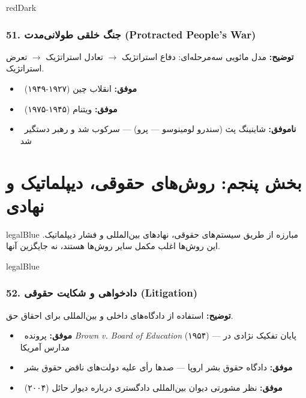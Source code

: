 \documentclass[a4paper,12pt]{article}
\newcommand{\success}[1]{\textcolor{greenPrimary}{\faCheckCircle\ \textbf{موفق:}} #1}
\newcommand{\failure}[1]{\textcolor{redPrimary}{\faTimesCircle\ \textbf{ناموفق:}} #1}
\newcommand{\methodnum}[1]{\textcolor{purpleLight}{\textbf{#1.}}}
\begin{document}
\begin{methodcard}{redDark}
\subsubsection{\methodnum{51} جنگ خلقی طولانی‌مدت (Protracted People's War)}
\textbf{توضیح:} مدل مائویی سه‌مرحله‌ای: دفاع استراتژیک $\rightarrow$ تعادل استراتژیک $\rightarrow$ تعرض استراتژیک.

\begin{itemize}[label=\textcolor{greenPrimary}{\faCheckCircle}]
  \item \success{انقلاب چین (۱۹۲۷-۱۹۴۹)}
  \item \success{ویتنام (۱۹۴۵-۱۹۷۵)}
\end{itemize}
\begin{itemize}[label=\textcolor{redPrimary}{\faTimesCircle}]
  \item \failure{شاینینگ پث (سندرو لومینوسو — پرو) — سرکوب شد و رهبر دستگیر شد}
\end{itemize}
\end{methodcard}



\section{\textcolor{legalBlue}{\faBalanceScale} بخش پنجم: روش‌های حقوقی، دیپلماتیک و نهادی}

\begin{sectionbox}{legalBlue}
مبارزه از طریق سیستم‌های حقوقی، نهادهای بین‌المللی و فشار دیپلماتیک. این روش‌ها اغلب مکمل سایر روش‌ها هستند، نه جایگزین آنها.
\end{sectionbox}

\begin{methodcard}{legalBlue}
\subsubsection{\methodnum{52} دادخواهی و شکایت حقوقی (Litigation)}
\textbf{توضیح:} استفاده از دادگاه‌های داخلی و بین‌المللی برای احقاق حق.

\begin{itemize}[label=\textcolor{greenPrimary}{\faCheckCircle}]
  \item \success{پرونده \textit{Brown v. Board of Education} (۱۹۵۴) — پایان تفکیک نژادی در مدارس آمریکا}
  \item \success{دادگاه حقوق بشر اروپا — صدها رأی علیه دولت‌های ناقض حقوق بشر}
  \item \success{نظر مشورتی دیوان بین‌المللی دادگستری درباره دیوار حائل (۲۰۰۴)}
\end{itemize}
\end{methodcard}
\end{document}
